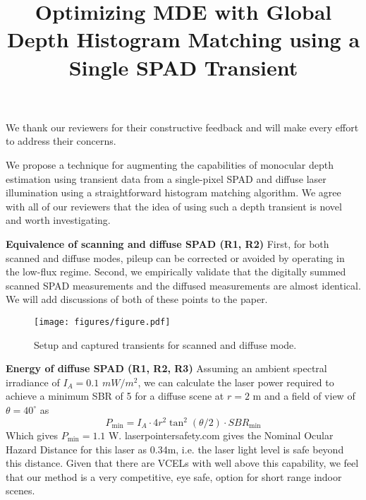 \documentclass[10pt,twocolumn,letterpaper]{article}
\begin{document}
\title{Optimizing MDE with Global Depth Histogram
  Matching using a Single SPAD Transient}

\maketitle
\thispagestyle{empty}
We thank our reviewers for their constructive feedback and will make every
effort to address their concerns.

We propose a technique for augmenting the capabilities of monocular depth
estimation using transient data from a single-pixel SPAD and diffuse laser
illumination using a straightforward histogram matching algorithm. We agree with
all of our reviewers that the idea of using such a depth transient is novel and
worth investigating.

\vspace{1mm}\noindent\textbf{Equivalence of scanning and diffuse SPAD (R1, R2)}
First, for
both scanned and diffuse modes, pileup can be corrected \cite{heide2018subpico} or avoided by operating in the
low-flux regime. 
Second, we empirically validate that the digitally summed scanned SPAD
measurements and the diffused measurements are almost identical. We will add
discussions of both of these points to the paper.
\vspace{-2mm}
\begin{figure}[H]
  \centering
  \texttt{[image: figures/figure.pdf]}
  \caption{Setup and captured transients for scanned and diffuse mode.}
\end{figure}

\vspace{-3mm}\noindent\textbf{Energy of diffuse SPAD (R1, R2, R3)}
Assuming an ambient spectral irradiance of $I_A = 0.1$ $mW/m^2$, we can calculate the
laser power required to achieve a minimum SBR of 5 for a diffuse scene at $r = 2$ m
and a field of view of $\theta = 40^\circ$ as
\begin{equation}
  P_{\text{min}} = I_A \cdot 4 r^2 \tan^2(\theta/2) \cdot SBR_{\text{min}}
\end{equation}
Which gives $P_{\text{min}} = 1.1$ W. laserpointersafety.com gives the Nominal
Ocular Hazard Distance for this laser as 0.34m, i.e. the laser light level is
safe beyond this distance. Given that there are VCELs with well above
this capability, we feel that our method is a very competitive, eye safe, option for short
range indoor scenes. 
\end{document}
